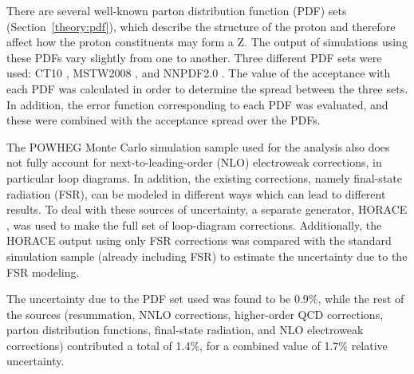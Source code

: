 
There are several well-known
parton distribution function (PDF) sets
(Section~\ref{theory:pdf}), 
which describe the structure of the proton 
and therefore affect how the proton constituents 
may form a Z.  
The output of simulations
using these PDFs vary slightly from one to another.
Three different PDF sets were used: 
CT10 \cite{CT10}, MSTW2008 \cite{MSTW}, and NNPDF2.0 \cite{NNPDF}.  
The value of the acceptance with each PDF was calculated 
in order to determine the spread between the three sets.  
In addition, the error function corresponding to each PDF 
was evaluated, 
and these were combined with the acceptance spread 
over the PDFs.  



The POWHEG Monte Carlo simulation sample used for the analysis 
also does not fully account for next-to-leading-order (NLO) 
electroweak corrections, 
in particular loop diagrams.  
In addition, the existing corrections, 
namely final-state radiation (FSR), 
can be modeled in different ways 
which can lead to different results.  
To deal with these sources of uncertainty, 
a separate generator, HORACE \cite{horace1} \cite{horace2}, 
was used to make the full set of loop-diagram corrections.  
Additionally, the HORACE output using only FSR corrections 
was compared with the 
standard simulation sample 
(already including FSR) to estimate 
the uncertainty due to the FSR modeling.  



The uncertainty due to the PDF set used 
was found to be 0.9\%, 
while the rest of the sources 
(resummation, NNLO corrections, higher-order QCD corrections, 
parton distribution functions, 
final-state radiation, and NLO electroweak corrections) 
contributed a total of 1.4\%, 
for a combined value of 1.7\% relative uncertainty.  





